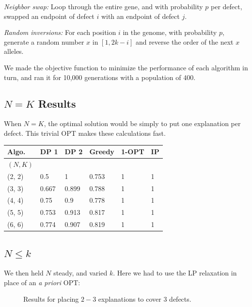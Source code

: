 {\it Neighbor swap:} Loop through the entire gene, and with probability $p$ per defect, swapped an endpoint of defect $i$ with an endpoint of defect $j$.

{\it Random inversions:} For each position $i$ in the genome, with probability $p$, generate a random number $x$ in $[1,2k-i]$ and reverse the order of the next $x$ alleles.  

We made the objective function to minimize the performance of each algorithm in turn, and ran it for 10,000 generations with a population of 400.  

\subsection{$N=K$ Results}

When $N=K$, the optimal solution would be simply to put one explanation per defect.  This trivial OPT makes these calculations fast.

\begin{tabular}{l|lllll}
{\bf Algo.} & DP 1 & DP 2 & Greedy & 1-OPT  & IP \\ \hline
{\bf $(N,K)$ } \\
(2, 2) & 0.5 & 1 & 0.753 & 1 & 1 \\
(3, 3) & 0.667 & 0.899 & 0.788 & 1 & 1\\
(4, 4) & 0.75 & 0.9 & 0.778 & 1 & 1 \\
(5, 5) & 0.753 & 0.913 & 0.817 & 1 & 1 \\
(6, 6) & 0.774 & 0.907 & 0.819 & 1 & 1 \\
\end{tabular}

\subsection{$N \leq k$}

We then held $N$ steady, and varied $k$. Here we had to use the LP relaxation in place of an {\it a priori } OPT:

\begin{figure}[ht!] \centering
  \caption{Results for placing $2-3$ explanations to cover $3$ defects.}
\end{figure}
\FloatBarrier

